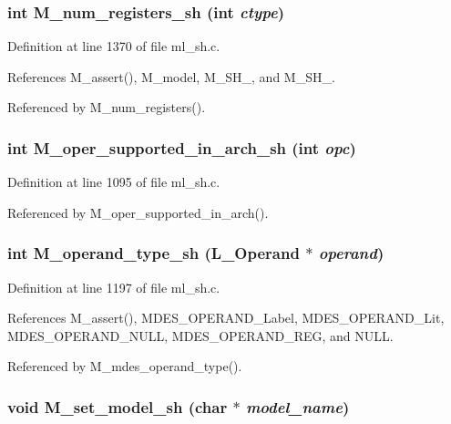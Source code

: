 \subsubsection{\setlength{\rightskip}{0pt plus 5cm}int M\_\-num\_\-registers\_\-sh (int {\em ctype})}\label{m__sh_8h_9236ee4b265c482fbe59f1c30986ff8c}




Definition at line 1370 of file ml\_\-sh.c.

References M\_\-assert(), M\_\-model, M\_\-SH\_, and M\_\-SH\_.

Referenced by M\_\-num\_\-registers().
\subsubsection{\setlength{\rightskip}{0pt plus 5cm}int M\_\-oper\_\-supported\_\-in\_\-arch\_\-sh (int {\em opc})}\label{m__sh_8h_bd9c30adefdfc96784dd6c7f33cb1385}




Definition at line 1095 of file ml\_\-sh.c.

Referenced by M\_\-oper\_\-supported\_\-in\_\-arch().
\subsubsection{\setlength{\rightskip}{0pt plus 5cm}int M\_\-operand\_\-type\_\-sh (L\_\-Operand $\ast$ {\em operand})}\label{m__sh_8h_aa248ce48a1eb7004120fbee41ce7943}




Definition at line 1197 of file ml\_\-sh.c.

References M\_\-assert(), MDES\_\-OPERAND\_\-Label, MDES\_\-OPERAND\_\-Lit, MDES\_\-OPERAND\_\-NULL, MDES\_\-OPERAND\_\-REG, and NULL.

Referenced by M\_\-mdes\_\-operand\_\-type().
\subsubsection{\setlength{\rightskip}{0pt plus 5cm}void M\_\-set\_\-model\_\-sh (char $\ast$ {\em model\_\-name})}\label{m__sh_8h_bc009df401271aab8227dfedb1dd0721}




